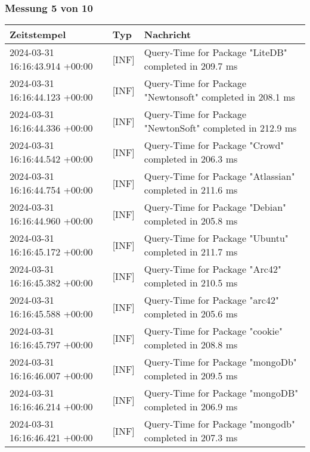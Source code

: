         \subsubsection{Messung 5 von 10} \label{subsubsec:MySQLOhneIndex5von10}
        {
            {\small
                \begin{tabularx}{\textwidth}{|l|l|X|}
                    \hline
                    \textbf{Zeitstempel} & \textbf{Typ} & \textbf{Nachricht} \\
                    \hline
                    \endhead
                    2024-03-31 16:16:43.914 +00:00 & [INF] & Query-Time for Package "LiteDB" completed in 209.7 ms \\
                    2024-03-31 16:16:44.123 +00:00 & [INF] & Query-Time for Package "Newtonsoft" completed in 208.1 ms \\
                    2024-03-31 16:16:44.336 +00:00 & [INF] & Query-Time for Package "NewtonSoft" completed in 212.9 ms \\
                    2024-03-31 16:16:44.542 +00:00 & [INF] & Query-Time for Package "Crowd" completed in 206.3 ms \\
                    2024-03-31 16:16:44.754 +00:00 & [INF] & Query-Time for Package "Atlassian" completed in 211.6 ms \\
                    2024-03-31 16:16:44.960 +00:00 & [INF] & Query-Time for Package "Debian" completed in 205.8 ms \\
                    2024-03-31 16:16:45.172 +00:00 & [INF] & Query-Time for Package "Ubuntu" completed in 211.7 ms \\
                    2024-03-31 16:16:45.382 +00:00 & [INF] & Query-Time for Package "Arc42" completed in 210.5 ms \\
                    2024-03-31 16:16:45.588 +00:00 & [INF] & Query-Time for Package "arc42" completed in 205.6 ms \\
                    2024-03-31 16:16:45.797 +00:00 & [INF] & Query-Time for Package "cookie" completed in 208.8 ms \\
                    2024-03-31 16:16:46.007 +00:00 & [INF] & Query-Time for Package "mongoDb" completed in 209.5 ms \\
                    2024-03-31 16:16:46.214 +00:00 & [INF] & Query-Time for Package "mongoDB" completed in 206.9 ms \\
                    2024-03-31 16:16:46.421 +00:00 & [INF] & Query-Time for Package "mongodb" completed in 207.3 ms \\

\end{tabularx}}}
